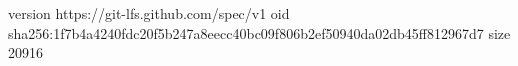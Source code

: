 version https://git-lfs.github.com/spec/v1
oid sha256:1f7b4a4240fdc20f5b247a8eecc40bc09f806b2ef50940da02db45ff812967d7
size 20916
